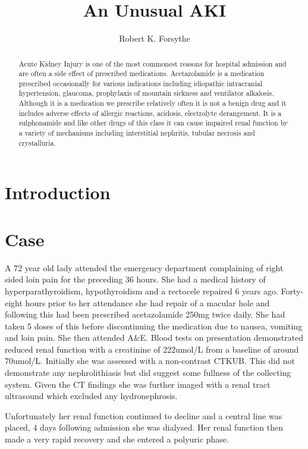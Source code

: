 \documentclass[11pt, ]{article}
\title{An Unusual AKI}
\author{Robert K. Forsythe}
\begin{document}
\maketitle
\begin{abstract}
	Acute Kidney Injury is one of the most commonest reasons for hospital admission and are often a side effect of prescribed medications. Acetazolamide is a medication prescribed occasionally for various indications including idiopathic intracranial hypertension, glaucoma, prophylaxis of mountain sickness and ventilator alkalosis. Although it is a medication we prescribe relatively often it is not a benign drug and it includes adverse effects of allergic reactions, acidosis, electrolyte derangement. It is a sulphonamide and like other drugs of this class it can cause impaired renal function by a variety of mechanisms including interstitial nephritis, tubular necrosis and crystalluria.  
\end{abstract}

\section*{Introduction}

		
\section*{Case}

A 72 year old lady attended the emergency department complaining of right sided loin pain for the preceding 36 hours. She had a medical history of hyperparathyroidism, hypothyroidism and a rectocele repaired 6 years ago. Forty-eight hours prior to her attendance she had repair of a macular hole and following this had been prescribed acetazolamide 250mg twice daily. She had taken 5 doses of this before discontinuing the medication due to nausea, vomiting and loin pain. She then attended A\&E. Blood tests on presentation demonstrated reduced renal function with a creatinine of 222umol/L from a baseline of around 70umol/L. Initially she was assessed with a non-contrast CTKUB. This did not demonstrate any nephrolithiasis but did suggest some fullness of the collecting system. Given the CT findings she was further imaged with a renal tract ultrasound which excluded any hydronephrosis. 

Unfortunately her renal function continued to decline and a central line was placed, 4 days following admission she was dialysed. Her renal function then made a very rapid recovery and she entered a polyuric phase. 
\end{document}
